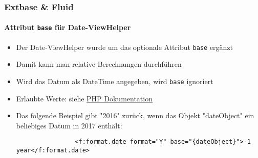 \begin{frame}[fragile]
	\frametitle{Extbase \& Fluid}
	\framesubtitle{Attribut \texttt{base} für Date-ViewHelper}


	\begin{itemize}

		\item Der Date-ViewHelper wurde um das optionale Attribut \texttt{base} ergänzt
		\item Damit kann man relative Berechnungen durchführen
		\item Wird das Datum als DateTime angegeben, wird \texttt{base} ignoriert
		\item Erlaubte Werte: siehe \href{http://www.php.net/manual/en/datetime.formats.relative.php}{PHP Dokumentation}
		\item Das folgende Beispiel gibt "2016" zurück, wenn das Objekt "dateObject" ein beliebiges Datum in 2017 enthält:

			\begin{lstlisting}
				<f:format.date format="Y" base="{dateObject}">-1 year</f:format.date>
			\end{lstlisting}

	\end{itemize}

\end{frame}


